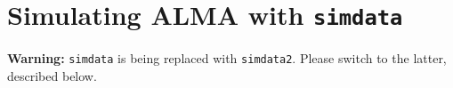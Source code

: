
\section{Simulating ALMA with {\tt simdata}}
\label{section:sim.almasimmos_old}

{\bfseries Warning:} {\tt simdata} is being replaced with {\tt simdata2}.  Please switch to the 
latter, described below.

